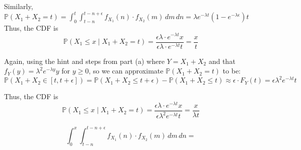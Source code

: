 \documentclass{article}
\begin{document}
Similarly, $\mathbb{P}(X_1 + X_2 = t) = \int_0^t \int_{t-n}^{t-n+\epsilon}
	f_{X_1}(n) \cdot f_{X_2}(m) \,dm \,dn =
\lambda e^{-\lambda t}(1-e^{-\lambda\epsilon})t$ \\

Thus, the CDF is
$$\mathbb{P}(X_1\leq x\mid X_1 + X_2 = t) =
\frac{\epsilon\lambda\cdot e^{-\lambda t}x}
	{\epsilon\lambda\cdot e^{-\lambda t}t} =
\frac{x}{t}
$$



Again, using the hint and steps from part (a) where $Y = X_1 + X_2$ and that $f_Y(y) = \lambda^2 e^{-\lambda y} y$ for $y\geq 0$, so we can approximate $\mathbb{P}(X_1 + X_2 = t)$ to be:
$$\mathbb{P}(X_1 + X_2 \in [t, t+\epsilon]) =
\mathbb{P}(X_1 + X_2\leq t+\epsilon) - \mathbb{P}(X_1 + X_2\leq t)
	\approx
\epsilon\cdot F_Y(t) =
\epsilon\lambda^2 e^{-\lambda t} t$$

Thus, the CDF is
$$\mathbb{P}(X_1\leq x\mid X_1 + X_2 = t) =
\frac{\epsilon\lambda\cdot e^{-\lambda t}x}
	{\epsilon\lambda^2 e^{-\lambda t} t} =
\frac{x}{\lambda t}
$$

$$\int_0^x \int_{t-n}^{t-n+\epsilon}
	f_{X_1}(n) \cdot f_{X_2}(m) \,dm \,dn =$$



\pagebreak
\end{document}
